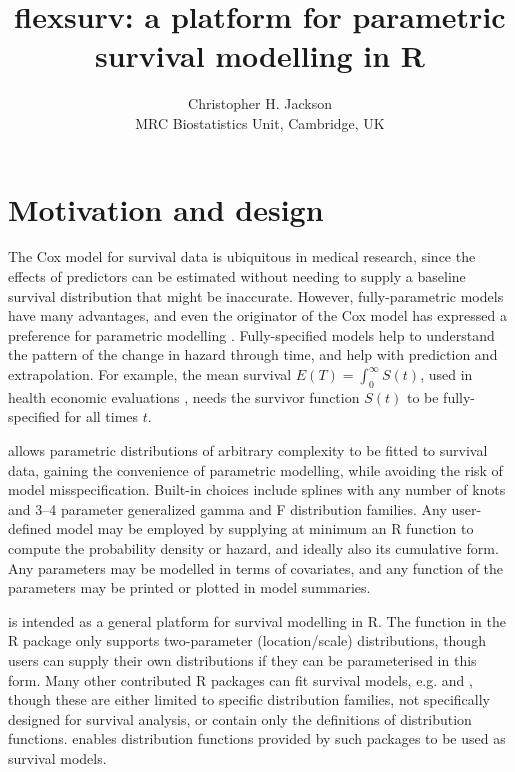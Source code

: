 \documentclass[nojss,nofooter]{jss}
\author{Christopher H. Jackson \\ MRC Biostatistics Unit, Cambridge, UK \\ \email{chris.jackson@mrc-bsu.cam.ac.uk}}
\title{flexsurv: a platform for parametric survival modelling in R}
\begin{document}
\section{Motivation and design}

The Cox model for survival data is ubiquitous in medical research,
since the effects of predictors can be estimated without needing to
supply a baseline survival distribution that might be inaccurate.
However, fully-parametric models have many advantages, and even the
originator of the Cox model has expressed a preference for parametric
modelling \citep[see][]{reid:cox:conversation}.  Fully-specified
models help to understand the pattern of the change in hazard through
time, and help with prediction and extrapolation. For example, the
mean survival $E(T) = \int_0^{\infty}S(t)$, used in health economic
evaluations \citep{latimer2013survival}, needs the survivor function
$S(t)$ to be fully-specified for all times $t$.


 allows parametric distributions of
arbitrary complexity to be fitted to survival data, gaining the
convenience of parametric modelling, while avoiding the risk of model
misspecification.  Built-in choices include splines with any number of
knots \citep{royston:parmar} and 3--4 parameter generalized gamma and
F distribution families.  Any user-defined model may be employed by
supplying at minimum an R function to compute the probability density
or hazard, and ideally also its cumulative form.  Any parameters may
be modelled in terms of covariates, and any function of the parameters
may be printed or plotted in model summaries.

 is intended as a general platform for survival
modelling in R.  The  function in the R package
 \citep{therneau:survival} only supports two-parameter
(location/scale) distributions, though users can supply their own
distributions if they can be parameterised in this form.  Many other
contributed R packages can fit survival models, e.g. 
\citep{eha} and  \citep{yee:wild}, though these are either
limited to specific distribution families, not specifically designed
for survival analysis, or \citep[,][]{actudistns}
contain only the definitions of distribution functions.
 enables distribution functions provided by such
packages to be used as survival models.
\end{document}
